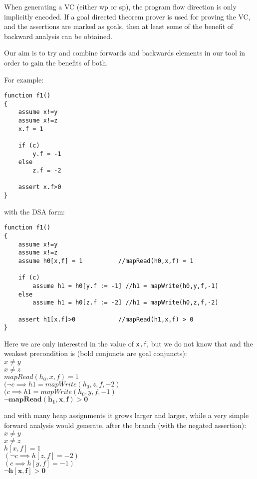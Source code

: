 When generating a VC (either wp or sp), the program flow direction is only implicitly encoded.
If a goal directed theorem prover is used for proving the VC, and the assertions are marked as goals, then at least some of the benefit of backward analysis can be obtained.

Our aim is to try and combine forwards and backwards elements in our tool in order to gain the benefits of both.

For example:
\begin{lstlisting}
function f1()
{
	assume x!=y
	assume x!=z
	x.f = 1
	
	if (c)
		y.f = -1
	else
		z.f = -2
		
	assert x.f>0
}
\end{lstlisting}		

with the DSA form:

\begin{lstlisting}
function f1()
{
	assume x!=y
	assume x!=z
	assume h0[x,f] = 1          //mapRead(h0,x,f) = 1
	
	if (c)
		assume h1 = h0[y.f := -1] //h1 = mapWrite(h0,y,f,-1)
	else
		assume h1 = h0[z.f := -2] //h1 = mapWrite(h0,z,f,-2)
		
	assert h1[x.f]>0            //mapRead(h1,x,f) > 0
}
\end{lstlisting}		

Here we are only interested in the value of \lstinline{x.f}, but we do not know that  and the weakest precondition is (bold conjuncts are goal conjuncts): \\
	$x \neq y$ \\
	$x \neq z$ \\
	$mapRead(h_0,x,f) = 1 $ \\
	$(\lnot c \implies h1 = mapWrite(h_0,z,f,-2) $ \\
	$(      c \implies h1 = mapWrite(h_0,y,f,-1) $ \\
	$\mathbf{\lnot mapRead(h_1,x,f) > 0} $

and with many heap assignments it grows larger and larger, while a very simple forward analysis would generate, after the branch (with the negated assertion):\\
	$x \neq y $ \\
	$x \neq z $ \\
	$h[x,f] = 1 $ \\
	$(\lnot c \implies h[z,f]=-2)$ \\
	$(      c \implies h[y,f]=-1)$ \\
	$\mathbf{\lnot h[x,f] > 0}$

